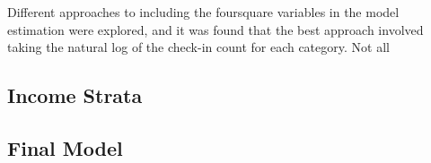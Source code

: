 Different approaches to including the foursquare variables in the model estimation were explored, and it was found that the best approach involved taking the natural log of the check-in count for each category. Not all 


\subsection{Income Strata}



\subsection{Final Model}


